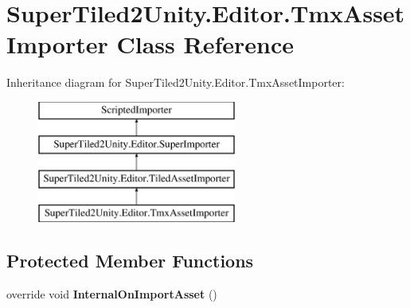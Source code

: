 \hypertarget{class_super_tiled2_unity_1_1_editor_1_1_tmx_asset_importer}{}\section{Super\+Tiled2\+Unity.\+Editor.\+Tmx\+Asset\+Importer Class Reference}
\label{class_super_tiled2_unity_1_1_editor_1_1_tmx_asset_importer}
Inheritance diagram for Super\+Tiled2\+Unity.\+Editor.\+Tmx\+Asset\+Importer\+:\begin{figure}[H]
\begin{center}
\leavevmode
\includegraphics[height=4.000000cm]{class_super_tiled2_unity_1_1_editor_1_1_tmx_asset_importer}
\end{center}
\end{figure}
\subsection*{Protected Member Functions}
\begin{DoxyCompactItemize}
\item 
\mbox{\label{class_super_tiled2_unity_1_1_editor_1_1_tmx_asset_importer_a273d84a067dc4df4ed4d3e0b2555288c}} 
override void {\bfseries Internal\+On\+Import\+Asset} ()
\end{DoxyCompactItemize}
